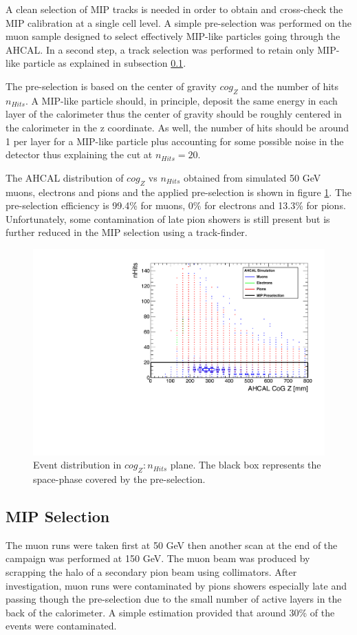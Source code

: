 A clean selection of MIP tracks is needed in order to obtain and cross-check the MIP calibration at a single cell level. A simple pre-selection was performed on the muon sample designed to select effectively MIP-like particles going through the AHCAL. In a second step, a track selection was performed to retain only MIP-like particle as explained in subsection \ref{subsec:Muon_sel}.

The pre-selection is based on the center of gravity $cog_Z$ and the number of hits $n_{Hits}$. A MIP-like particle should, in principle, deposit the same energy in each layer of the calorimeter thus the center of gravity should be roughly centered in the calorimeter in the z coordinate. As well, the number of hits should be around 1 per layer for a MIP-like particle plus accounting for some possible noise in the detector thus explaining the cut at $n_{Hits} = 20$.

The AHCAL distribution of $cog_Z$ vs $n_{Hits}$ obtained from simulated 50 GeV muons, electrons and pions and the applied pre-selection is shown in figure \ref{fig:Muons_CoGZ_nHits}. The pre-selection efficiency is 99.4\% for muons, 0\% for electrons and 13.3\% for pions. Unfortunately, some contamination of late pion showers is still present but is further reduced in the MIP selection using a track-finder.

\begin{figure}[htbp!]
	\centering
	\includegraphics[width=0.5\linewidth]{chap5/fig_AHCAL_timing/Muons/SelectionCut_nHitsCoGZ_Muons}
	\caption{Event distribution in $cog_Z:n_{Hits}$ plane. The black box represents the space-phase covered by the pre-selection.} \label{fig:Muons_CoGZ_nHits}
\end{figure}

\subsection{MIP Selection}
\label{subsec:Muon_sel}

The muon runs were taken first at 50 GeV then another scan at the end of the campaign was performed at 150 GeV. The muon beam was produced by scrapping the halo of a secondary pion beam using collimators. After investigation, muon runs were contaminated by pions showers especially late and passing though the pre-selection due to the small number of active layers in the back of the calorimeter. A simple estimation provided that around 30\% of the events were contaminated.

